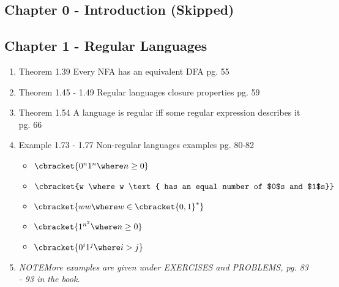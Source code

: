 \documentclass[12pt]{article} %
\newcommand{\theoremitem}[3]{\item #1 \quad #2 \dotfill #3}
\newcommand{\noteitem}[1]{\item \textit{NOTE\quad #1}}
\newenvironment{theoremlist} {
    \begin{enumerate}[nosep,leftmargin=*,label={}]
} {
    \end{enumerate}
}
\begin{document}
\subsection{Chapter 0 - Introduction (Skipped)}

\subsection{Chapter 1 - Regular Languages}
\begin{theoremlist}
    \theoremitem{Theorem 1.39}
    {Every NFA has an equivalent DFA}
    {pg. 55}
    \theoremitem{Theorem 1.45 - 1.49}
    {Regular languages closure properties}
    {pg. 59}
    \theoremitem{Theorem 1.54}
    {A language is regular iff some regular expression describes it}
    {pg. 66}
    \theoremitem{Example 1.73 - 1.77}
    {Non-regular languages examples}
    {pg. 80-82}
    \begin{multicols}{2}
    \begin{itemize}[nosep]
        \item {$\cbracket{0^n 1^n \where n \geq 0}$}
        \item {$\cbracket{w \where w \text{ has an equal number of $0$s and $1$s}}$}
        \item {$\cbracket{ww \where w \in \cbracket{0,1}^*}$}
        \item {$\cbracket{1^{n^2} \where n \geq 0}$}
        \item {$\cbracket{0^i 1^j \where i > j}$}
    \end{itemize}
    \end{multicols}
    \noteitem{More examples are given under {\normalfont EXERCISES} and {\normalfont PROBLEMS}, pg. 83 - 93 in the book.}
\end{theoremlist}
\end{document}
